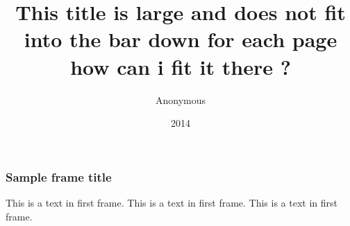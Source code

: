 \documentclass{beamer}
\title{This title is large and does not fit into the bar down for each page how can i fit it there ? }
\author{Anonymous}
\institute{ShareLaTeX}
\date{2014}
\begin{document}
\frame{\titlepage}
\begin{frame}
\frametitle{Sample frame title}
This is a text in first frame. This is a text in first frame. This is a text in first frame.
\end{frame}
\end{document}
